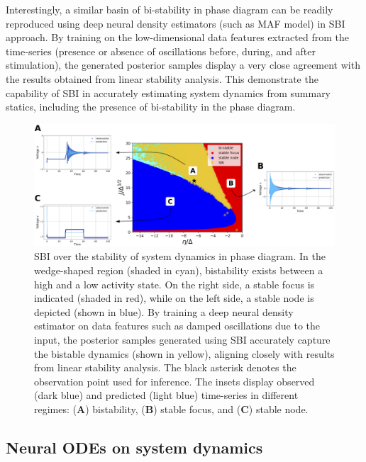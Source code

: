 \documentclass[preprint,11pt,authoryear]{elsarticle}
\begin{document}
Interestingly, a similar basin of bi-stability in phase diagram can be readily reproduced using deep neural density estimators (such as MAF model) in SBI approach. By training on the low-dimensional data features extracted from the time-series (presence or absence of oscillations before, during, and after stimulation), the generated posterior samples display a very close agreement with the results obtained from linear stability analysis. This demonstrate the capability of SBI in accurately estimating system dynamics from summary statics, including the presence of bi-stability in the phase diagram.


 
\begin{figure}
    \centering
    \includegraphics[width=\linewidth]{Figs/Fig8.png}
    \caption{SBI over the stability of system dynamics in phase diagram. In the wedge-shaped region (shaded in cyan), bistability exists between a high and a low activity state. On the right side, a stable focus is indicated (shaded in red), while on the left side, a stable node is depicted (shown in blue). By training a deep neural density estimator on data features such as damped oscillations due to the input, the posterior samples generated using SBI accurately capture the bistable dynamics (shown in yellow), aligning closely with results from linear stability analysis. The black asterisk denotes the observation point used for inference. The insets display observed (dark blue) and predicted (light blue) time-series in different regimes: (\textbf{A}) bistability, (\textbf{B}) stable focus, and (\textbf{C}) stable node.}
    \label{fig:SBI_PhaseDiagram}
\end{figure}



\subsection{Neural ODEs on system dynamics}
\end{document}
